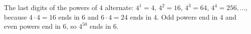 The last digits of the powers of $4$ alternate: $4^1=4$, $4^2=16$, $4^3=64$, $4^4=256,\dots$, because $4\cdot4=16$ ends in $6$ and $6\cdot4=24$ ends in $4$. Odd powers end in $4$ and even powers end in $6$, so $4^{50}$ ends in $\boxed{6}$.
